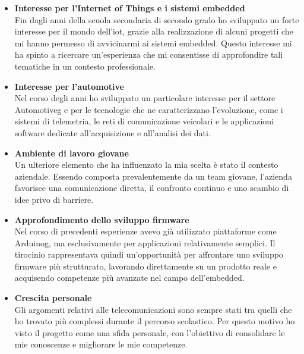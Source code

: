 \begin{itemize}

    \item \textbf{Interesse per l'Internet of Things e i sistemi embedded} \\
    Fin dagli anni della scuola secondaria di secondo grado ho sviluppato un forte interesse per il mondo dell'\gls{iot}, grazie 
    alla realizzazione di alcuni progetti che mi hanno permesso di avvicinarmi ai sistemi embedded. Questo interesse mi ha spinto a ricercare 
    un'esperienza che mi consentisse di approfondire tali tematiche in un contesto professionale.

    \item \textbf{Interesse per l'automotive} \\
    Nel corso degli anni ho sviluppato un particolare interesse per il settore \gls{Automotiveg} e per le tecnologie che ne caratterizzano l'evoluzione, 
    come i sistemi di telemetria, le reti di comunicazione veicolari e le applicazioni software dedicate all'acquisizione e all'analisi dei dati. 

    \item \textbf{Ambiente di lavoro giovane} \\
    Un ulteriore elemento che ha influenzato la mia scelta è stato il contesto aziendale. Essendo composta prevalentemente da un team giovane, 
    l'azienda favorisce una comunicazione diretta, il confronto continuo e uno scambio di idee privo di barriere.

    \item \textbf{Approfondimento dello sviluppo firmware} \\
    Nel corso di precedenti esperienze avevo già utilizzato piattaforme come \gls{Arduinog}, ma esclusivamente per applicazioni relativamente semplici.
    Il tirocinio rappresentava quindi un'opportunità per affrontare uno sviluppo firmware più strutturato, lavorando direttamente su un prodotto 
    reale e acquisendo competenze più avanzate nel campo dell'embedded.

    \item \textbf{Crescita personale} \\
    Gli argomenti relativi alle telecomunicazioni sono sempre stati tra quelli che ho trovato più complessi durante il percorso scolastico. 
    Per questo motivo ho visto il progetto come una sfida personale, con l'obiettivo di consolidare le mie conoscenze e migliorare le mie
     competenze.

\end{itemize}

